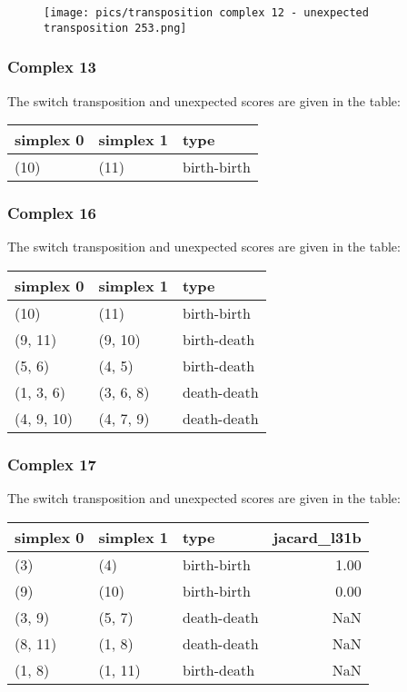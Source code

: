\documentclass{article}
\begin{document}
\begin{figure}[ht]
\centering
\texttt{[image: pics/transposition complex 12 - unexpected transposition 253.png]}
\end{figure}


\subsubsection{Complex 13}
\par The switch transposition and unexpected scores are given in the table:
\begin{center}
\begin{tabular}{lll}
\toprule
simplex 0 & simplex 1 & type \\
\midrule
(10) & (11) & birth-birth \\
\bottomrule
\end{tabular}
\end{center}


\subsubsection{Complex 16}
\par The switch transposition and unexpected scores are given in the table:
\begin{center}
\begin{tabular}{lll}
\toprule
simplex 0 & simplex 1 & type \\
\midrule
(10) & (11) & birth-birth \\
(9, 11) & (9, 10) & birth-death \\
(5, 6) & (4, 5) & birth-death \\
(1, 3, 6) & (3, 6, 8) & death-death \\
(4, 9, 10) & (4, 7, 9) & death-death \\
\bottomrule
\end{tabular}
\end{center}


\subsubsection{Complex 17}
\par The switch transposition and unexpected scores are given in the table:
\begin{center}
\begin{tabular}{lllr}
\toprule
simplex 0 & simplex 1 & type & jacard\_l31b \\
\midrule
(3) & (4) & birth-birth & 1.00 \\
(9) & (10) & birth-birth & 0.00 \\
(3, 9) & (5, 7) & death-death & NaN \\
(8, 11) & (1, 8) & death-death & NaN \\
(1, 8) & (1, 11) & birth-death & NaN \\
\bottomrule
\end{tabular}
\end{center}
\end{document}
